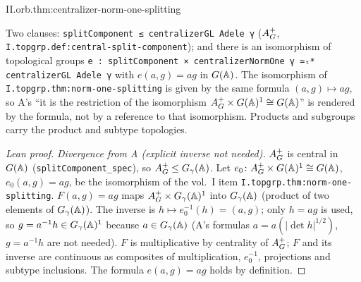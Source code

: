 \begin{theorem}
\end{theorem}
\begin{tfformal}{II.orb.thm:centralizer-norm-one-splitting}
\begin{tffidelity}
Two clauses: \texttt{splitComponent ≤ centralizerGL Adele γ} ($A_G^+$, \texttt{I.topgrp.def:central-split-component}); and there is an isomorphism of topological groups \texttt{e : splitComponent × centralizerNormOne γ ≃ₜ* centralizerGL Adele γ} with $e(a,g)=ag$ in $G(\mathbb{A})$. The isomorphism of \texttt{I.topgrp.thm:norm-one-splitting} is given by the same formula $(a,g)\mapsto ag$, so A's ``it is the restriction of the isomorphism $A_G^+\times G(\mathbb{A})^1\cong G(\mathbb{A})$'' is rendered by the formula, not by a reference to that isomorphism. Products and subgroups carry the product and subtype topologies.
\end{tffidelity}
\end{tfformal}
\begin{proof}[Lean proof]
\emph{Divergence from A (explicit inverse not needed).} $A_G^+$ is central in $G(\mathbb{A})$ (\texttt{splitComponent\_spec}), so $A_G^+\le G_\gamma(\mathbb{A})$. Let $e_0\colon A_G^+\times G(\mathbb{A})^1\cong G(\mathbb{A})$, $e_0(a,g)=ag$, be the isomorphism of the vol.~I item \texttt{I.topgrp.thm:norm-one-splitting}. $F(a,g)=ag$ maps $A_G^+\times G_\gamma(\mathbb{A})^1$ into $G_\gamma(\mathbb{A})$ (product of two elements of $G_\gamma(\mathbb{A})$). The inverse is $h\mapsto e_0^{-1}(h)=(a,g)$; only $h=ag$ is used, so $g=a^{-1}h\in G_\gamma(\mathbb{A})^1$ because $a\in G_\gamma(\mathbb{A})$ (A's formulas $a=a(|\det h|^{1/2})$, $g=a^{-1}h$ are not needed). $F$ is multiplicative by centrality of $A_G^+$; $F$ and its inverse are continuous as composites of multiplication, $e_0^{-1}$, projections and subtype inclusions. The formula $e(a,g)=ag$ holds by definition.
\end{proof}

